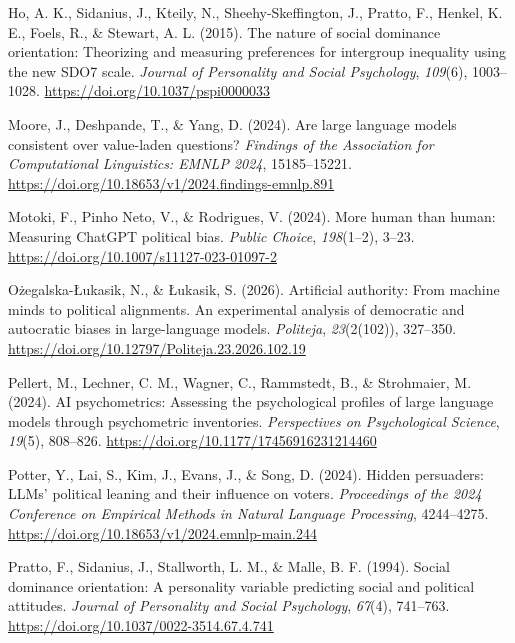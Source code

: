 \documentclass[
]{article}
\newlength{\cslhangindent}
\newenvironment{CSLReferences}[2] %
 {\begin{list}{}{%
  \setlength{\itemindent}{0pt}
  \setlength{\leftmargin}{0pt}
  \setlength{\parsep}{0pt}
  \ifodd #1
   \setlength{\leftmargin}{\cslhangindent}
   \setlength{\itemindent}{-1\cslhangindent}
  \fi
  \setlength{\itemsep}{#2\baselineskip}}}
 {\end{list}}
\begin{document}
\begin{CSLReferences}{1}{0}
Ho, A. K., Sidanius, J., Kteily, N., Sheehy-Skeffington, J., Pratto, F.,
Henkel, K. E., Foels, R., \& Stewart, A. L. (2015). The nature of social
dominance orientation: Theorizing and measuring preferences for
intergroup inequality using the new {SDO7} scale. \emph{Journal of
Personality and Social Psychology}, \emph{109}(6), 1003--1028.
\url{https://doi.org/10.1037/pspi0000033}

Moore, J., Deshpande, T., \& Yang, D. (2024). Are large language models
consistent over value-laden questions? \emph{Findings of the Association
for Computational Linguistics: EMNLP 2024}, 15185--15221.
\url{https://doi.org/10.18653/v1/2024.findings-emnlp.891}

Motoki, F., Pinho Neto, V., \& Rodrigues, V. (2024). More human than
human: Measuring {ChatGPT} political bias. \emph{Public Choice},
\emph{198}(1--2), 3--23.
\url{https://doi.org/10.1007/s11127-023-01097-2}

Ożegalska-Łukasik, N., \& Łukasik, S. (2026). Artificial authority: From
machine minds to political alignments. {An} experimental analysis of
democratic and autocratic biases in large-language models.
\emph{Politeja}, \emph{23}(2(102)), 327--350.
\url{https://doi.org/10.12797/Politeja.23.2026.102.19}

Pellert, M., Lechner, C. M., Wagner, C., Rammstedt, B., \& Strohmaier,
M. (2024). {AI} psychometrics: Assessing the psychological profiles of
large language models through psychometric inventories.
\emph{Perspectives on Psychological Science}, \emph{19}(5), 808--826.
\url{https://doi.org/10.1177/17456916231214460}

Potter, Y., Lai, S., Kim, J., Evans, J., \& Song, D. (2024). Hidden
persuaders: {LLMs}' political leaning and their influence on voters.
\emph{Proceedings of the 2024 Conference on Empirical Methods in Natural
Language Processing}, 4244--4275.
\url{https://doi.org/10.18653/v1/2024.emnlp-main.244}

Pratto, F., Sidanius, J., Stallworth, L. M., \& Malle, B. F. (1994).
Social dominance orientation: A personality variable predicting social
and political attitudes. \emph{Journal of Personality and Social
Psychology}, \emph{67}(4), 741--763.
\url{https://doi.org/10.1037/0022-3514.67.4.741}


\end{CSLReferences}
\end{document}

